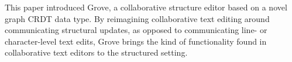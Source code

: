 \documentclass[nonacm, acmsmall, screen, review]{acmart}
\begin{document}
This paper introduced Grove, a collaborative structure editor based on a novel graph CRDT data type.
By reimagining collaborative text editing around communicating structural updates,
as opposed to communicating line- or character-level text edits,
Grove brings the kind of functionality found in collaborative text editors to the structured setting.




\end{document}
